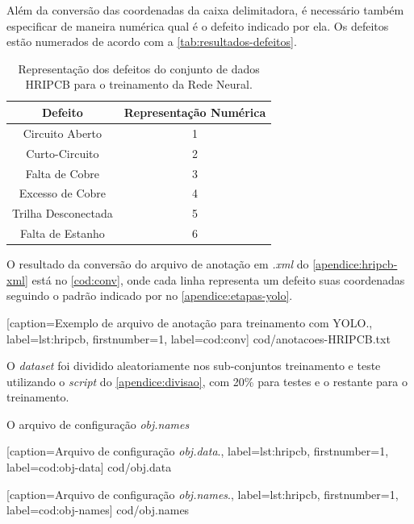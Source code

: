 Além da conversão das coordenadas da caixa delimitadora, é necessário também especificar de maneira numérica qual é o defeito indicado por ela. Os defeitos estão numerados de acordo com a \autoref{tab:resultados-defeitos}.

\begin{table}[!h]
  \begin{center}
  \caption{Representação dos defeitos do conjunto de dados HRIPCB para o treinamento da Rede Neural.}
  \label{tab:resultados-defeitos}
  \begin{tabular}{cc}
    \toprule
    \textbf{Defeito} & \textbf{Representação Numérica}\\
    \midrule \midrule
    Circuito Aberto     & 1 \\
    Curto-Circuito      & 2 \\
    Falta de Cobre      & 3 \\
    Excesso de Cobre    & 4 \\
    Trilha Desconectada & 5 \\
    Falta de Estanho    & 6 \\
    \bottomrule
  \end{tabular}
  \end{center}
\end{table}

O resultado da conversão do arquivo de anotação em \textit{.xml} do \autoref{apendice:hripcb-xml} está no \autoref{cod:conv}, onde cada linha representa um defeito suas coordenadas seguindo o padrão indicado por  no \autoref{apendice:etapas-yolo}.


[caption=Exemplo de arquivo de anotação para treinamento com YOLO.,
label=lst:hripcb,
firstnumber=1,
label=cod:conv]
{cod/anotacoes-HRIPCB.txt}

O \textit{dataset} foi dividido aleatoriamente nos sub-conjuntos treinamento e teste utilizando o \textit{script} do \autoref{apendice:divisao}, com 20\% para testes e o restante para o treinamento.  


O arquivo de configuração \textit{obj.names}


[caption=Arquivo de configuração \textit{obj.data}.,
label=lst:hripcb,
firstnumber=1,
label=cod:obj-data]
{cod/obj.data}


[caption=Arquivo de configuração \textit{obj.names}.,
label=lst:hripcb,
firstnumber=1,
label=cod:obj-names]
{cod/obj.names}


